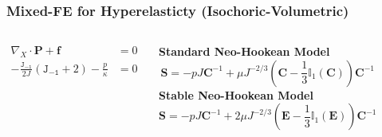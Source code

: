 \documentclass[aspectratio=169,xcolor=dvipsnames]{beamer}
\newcommand{\bm}{\boldsymbol}
\begin{document}
\begin{frame}
\frametitle{Mixed-FE for Hyperelasticty (Isochoric-Volumetric)}
\begin{columns}[c] 
    {\Large
    \begin{align}
        \nabla_X \cdot \bm{P} + \bm{f} &= 0 \nonumber \\
        -\frac{\mathtt{J_{-1}}}{2 J} \left(\mathtt{J_{-1}} + 2 \right) - \frac{p}{\kappa} &= 0 \nonumber
    \end{align}
    }

    \textbf{Standard Neo-Hookean Model}
    \begin{equation}
        \bm{S} = -p J \bm{C}^{-1} + \mu J^{-2/3} \left(\bm{C} - \frac{1}{3} \mathbb{{I}}_1(\bm{C}) \right) \bm{C}^{-1} \nonumber 
    \end{equation}
    \textbf{Stable Neo-Hookean Model}
    \begin{equation}
        \bm{S} = -p J \bm{C}^{-1} + 2\mu J^{-2/3} \left(\bm{E} - \frac{1}{3} \mathbb{{I}}_1(\bm{E}) \right) \bm{C}^{-1} \nonumber 
    \end{equation}
    \begin{figure}
            \includegraphics[width=0.95\linewidth]{figures/Iso-S.png}
    \end{figure}
    \end{columns}
\end{frame}

\end{document}
